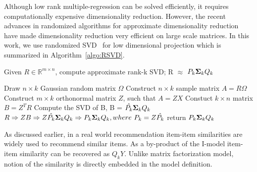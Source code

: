 Although low rank multiple-regression can be solved efficiently, it requires computationally expensive dimensionality reduction. However, the recent advances in randomized algorithms for approximate dimensionality reduction~\citep{halko2011} have made dimensionality reduction very efficient on large scale matrices. In this work, we use randomized SVD~\citep{halko2011} for low dimensional projection which is summarized in Algorithm~\ref{algo:RSVD}.


\begin{algorithm}
  	\small
	\caption{Given $R \in \mathbb{R}^{m \times n}$, compute approximate rank-k SVD; R $\approx$ $P_k \mathbf{\Sigma}_k Q_k$}
	\label{algo:RSVD}
	\begin{algorithmic}[1]

	\State Draw $n\times k$ Gaussian random matrix $\Omega$
	\State Construct $n\times k$ sample matrix $A = R\Omega$
	\State Construct $m\times k$ orthonormal matrix $Z$, such that $A  = ZX$
	\State Constuct $k\times n$ matrix $B = Z^TR$
	\State Compute the SVD of B, B =  $\hat{P_k} \mathbf{\Sigma}_k Q_k$
	\State  $R \Rightarrow ZB \Rightarrow Z \hat{P_k} \mathbf{\Sigma}_k Q_k \Rightarrow  P_k \mathbf{\Sigma}_k Q_k, where\ P_k = Z \hat{P_k}$
	\State return $P_k \mathbf{\Sigma}_k Q_k$
	\EndProcedure
	\end{algorithmic}
\end{algorithm}

As discussed earlier, in a real world recommendation item-item similarities are widely used to recommend similar items. As a by-product of the I-\LinearLow model item-item similarity can be recovered as $Q_kY$. Unlike matrix factorization model, notion of the similarity is directly embedded in the model definition.

\begin{equation*}
\end{equation*}


